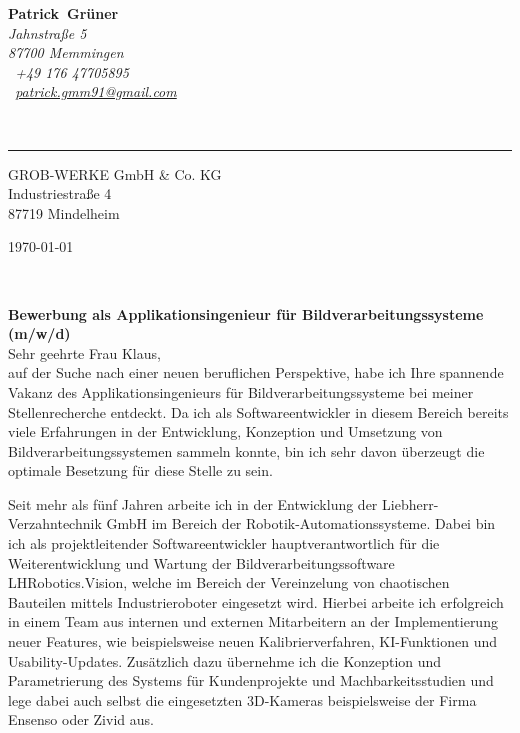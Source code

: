 \documentclass[10pt,a4paper]{article}
\def\firstname{Patrick}
\def\familyname{Grüner}
\begin{document}
\sffamily   %
\hfill%
\begin{minipage}[t]{.6\textwidth}
	\raggedleft%
	{\bfseries {\color{firstnamecolor}\firstname}~{\color{familynamecolor}\familyname}}\\[.35ex]
	\small\itshape%
	Jahnstraße 5\\
	87700 Memmingen\\[.35ex]
	\Mobilefone~+49 176 47705895\\
	\Letter~\href{mailto:patrick.gmm91@gmail.com}{patrick.gmm91@gmail.com}
\end{minipage}\\[0.5em]
%
{\color{firstnamecolor}\rule{\textwidth}{.25ex}}
%
\begin{minipage}[t]{.5\textwidth}
	\raggedright%
	\vspace*{1em}
	GROB-WERKE GmbH \& Co. KG\\[.35ex]
	\small%
	Industriestraße 4  \\
	87719 Mindelheim
\end{minipage}
%
\hfill
%
\begin{minipage}[t]{.4\textwidth}
	\raggedleft %
	\today
\end{minipage}\\[1em]
\raggedright

{\bfseries \color{familynamecolor}Bewerbung als Applikationsingenieur für Bildverarbeitungssysteme (m/w/d)\\[1.5em]}
Sehr geehrte Frau Klaus,\\[1em]
%
auf der Suche nach einer neuen beruflichen Perspektive, habe ich Ihre spannende Vakanz des Applikationsingenieurs für Bildverarbeitungssysteme bei meiner Stellenrecherche entdeckt. Da ich als Softwareentwickler in diesem Bereich bereits viele Erfahrungen in der Entwicklung, Konzeption und Umsetzung von Bildverarbeitungssystemen sammeln konnte, bin ich sehr davon überzeugt die optimale Besetzung für diese Stelle zu sein.

Seit mehr als fünf Jahren arbeite ich in der Entwicklung der Liebherr-Verzahntechnik GmbH im Bereich der Robotik-Automationssysteme. Dabei bin ich als projektleitender Softwareentwickler hauptverantwortlich für die Weiterentwicklung und Wartung der Bildverarbeitungssoftware LHRobotics.Vision, welche im Bereich der Vereinzelung von chaotischen Bauteilen mittels Industrieroboter eingesetzt wird. Hierbei arbeite ich erfolgreich in einem Team aus internen und externen Mitarbeitern an der Implementierung neuer Features, wie beispielsweise neuen Kalibrierverfahren, KI-Funktionen und Usability-Updates. Zusätzlich dazu übernehme ich die Konzeption und Parametrierung des Systems für Kundenprojekte und Machbarkeitsstudien und lege dabei auch selbst die eingesetzten 3D-Kameras beispielsweise der Firma Ensenso oder Zivid aus.
\end{document}
